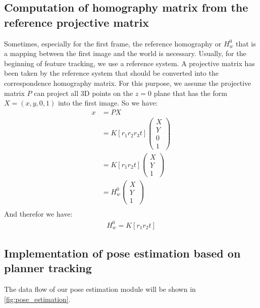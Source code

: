 \subsection{Computation of homography matrix from the reference projective matrix}
Sometimes, especially for the first frame, the reference homography or $H_{w}^{0}$ that is a mapping between the first image and the world is necessary. Usually, for the beginning of feature tracking, we use a reference system. A projective matrix has been taken by the reference system that should be converted into the correspondence homography matrix. For this purpose, we assume the projective matrix $P$ can project all 3D points on the $z=0$ plane that has the form $X=(x,y,0,1)$ into the first image. So we have:
\begin{align*} 
x  &=  P X \\
   &=  K [r_{1}r_{2}r_{3}t] 
 \begin{pmatrix}
  X \\
  Y \\
  0 \\
  1
 \end{pmatrix} \\
  &=  K [r_{1}r_{2}t] \begin{pmatrix}
  X \\
  Y \\
  1
 \end{pmatrix} \\
  &=  H_{w}^{0} \begin{pmatrix}
  X \\
  Y \\
  1
 \end{pmatrix} \\
\end{align*}
And therefor we have:
\begin{gather*}
	H_{w}^{0} = K [r_{1}r_{2}t]
\end{gather*}\label{eq:homography_to_projective}

\subsection{Implementation of pose estimation based on planner tracking}
The data flow of our pose estimation module will be shown in \autoref{fig:pose_estimation}.

